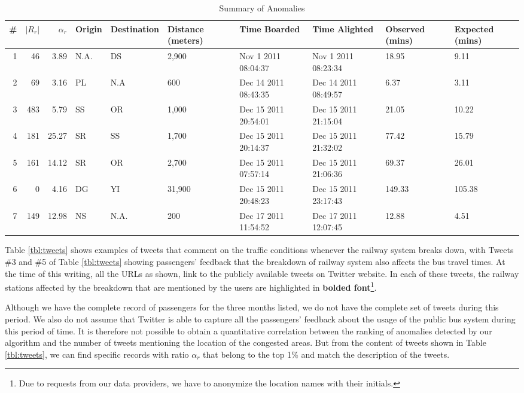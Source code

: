 \documentclass[conference]{IEEEtran.1.8}
\begin{document}
\begin{table}[htb]
	\centering
	\caption{Summary of Anomalies}
	\label{tbl:anomalies}
	\begin{tabular}{|r|r|r|p{2.3cm}|p{2.3cm}|p{1.2cm}|p{1.6cm}|p{1.6cm}|p{1.4cm}|p{1.4cm}|}
		\hline
		\# & $|R_r|$ & $\alpha_r$ & Origin & Destination & Distance (meters) & Time Boarded & Time Alighted & Observed (mins) & Expected (mins) \\
		\hline
		1 & 46 & 3.89 & N.A. & DS & 2,900 & Nov 1 2011 08:04:37 & Nov 1 2011 08:23:34 & 18.95 & 9.11 \\
		\hline
		2 & 69 & 3.16 & PL & N.A & 600 & Dec 14 2011 08:43:35 & Dec 14 2011 08:49:57 &6.37 & 3.11\\
		\hline
		3 & 483 & 5.79 & SS & OR & 1,000 & Dec 15 2011 20:54:01 & Dec 15 2011 21:15:04 & 21.05 & 10.22 \\
		\hline
		4 & 181 & 25.27 & SR & SS & 1,700 & Dec 15 2011 20:14:37 & Dec 15 2011 21:32:02 & 77.42 & 15.79 \\
		\hline
		5 & 161 & 14.12 & SR & OR & 2,700 & Dec 15 2011 07:57:14 & Dec 15 2011 21:06:36 & 69.37 & 26.01 \\
		\hline
		6 & 0 & 4.16 & DG & YI & 31,900 & Dec 15 2011 20:48:23 & Dec 15 2011 23:17:43 & 149.33 & 105.38 \\
		\hline
		7 & 149 & 12.98 & NS & N.A. & 200 & Dec 17 2011 11:54:52 & Dec 17 2011 12:07:45 & 12.88 & 4.51 \\
		\hline
	\end{tabular}
\end{table}

Table \ref{tbl:tweets} shows examples of tweets that comment on the traffic conditions whenever the railway system breaks down, with Tweets \#3 and \#5 of Table \ref{tbl:tweets} showing passengers' feedback that the breakdown of railway system also affects the bus travel times. At the time of this writing, all the URLs as shown, link to the publicly available tweets on Twitter website. In each of these tweets, the railway stations affected by the breakdown that are mentioned by the users are highlighted in \textbf{bolded font}\footnote{Due to requests from our data providers, we have to anonymize the location names with their initials.}.

Although we have the complete record of passengers for the three months listed, we do not have the complete set of tweets during this period. We also do not assume that Twitter is able to capture all the passengers' feedback about the usage of the public bus system during this period of time. It is therefore not possible to obtain a quantitative correlation between the ranking of anomalies detected by our algorithm and the number of tweets mentioning the location of the congested areas. But from the content of tweets shown in Table \ref{tbl:tweets}, we can find specific records with ratio $\alpha_r$ that belong to the top 1\% and match the description of the tweets.
\end{document}
